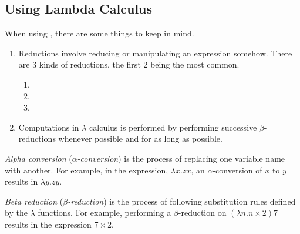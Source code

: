 \subsection{Using Lambda Calculus}\label{subsec:Using_Lambda_Calculus}
When using , there are some things to keep in mind.
\begin{enumerate}[noitemsep]
\item Reductions involve reducing or manipulating an expression somehow.
  There are 3 kinds of reductions, the first 2 being the most common.
  \begin{enumerate}[noitemsep]
  \item {}
  \item {}
  \item {}
  \end{enumerate}
\item Computations in $\lambda$ calculus is performed by performing successive $\beta$-reductions whenever possible and for as long as possible.
\end{enumerate}

\begin{definition}\label{def:Alpha_Conversion}
  \emph{Alpha conversion} (\emph{$\alpha$-conversion}) is the process of replacing one variable name with another.
  For example, in the expression, $\lambda x. zx$, an $\alpha$-conversion of $x$ to $y$ results in $\lambda y. zy$.
\end{definition}

\begin{definition}\label{def:Beta_Reduction}
  \emph{Beta reduction} (\emph{$\beta$-reduction}) is the process of following substitution rules defined by the $\lambda$ functions.
  For example, performing a $\beta$-reduction on $(\lambda n. n \times 2) 7$ results in the expression $7 \times 2$.
\end{definition}


